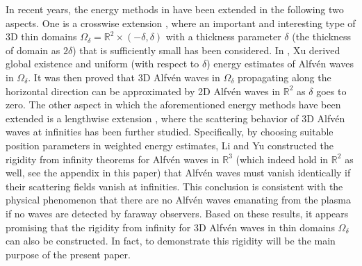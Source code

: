 \documentclass[10pt,reqno]{amsart}
\numberwithin{equation}{section}
\begin{document}
 In recent years, the 
energy methods in \cite{He-Xu-Yu} have been extended in the following 
two aspects. One is a crosswise extension \cite{Xu}, where an important and
 interesting type of  
3D thin domains $\Omega_{\delta}=\mathbb{R}^2\times (-\delta,\delta)$ with a thickness parameter $\delta$ (the thickness of domain as $2\delta$) that is sufficiently small has been  
considered.  
In \cite{Xu}, Xu derived global existence and uniform (with respect to $\delta$) energy estimates  of Alfv\'en waves in $\Omega_\delta$.  
It was then proved that  3D Alfv\'en waves in $\Omega_\delta$ propagating along the horizontal direction can be approximated by 2D Alfv\'en waves in $\mathbb{R}^2$ as
 $\delta$ goes to zero. 
The other aspect in which the aforementioned energy methods have been extended 
is a lengthwise extension \cite{Li-Yu}, where the scattering behavior of 3D 
 Alfv\'en waves at infinities has  been further 
 studied.  
 Specifically, by choosing suitable position parameters in weighted energy estimates, Li and Yu constructed the rigidity from infinity theorems for Alfv\'en waves in $\mathbb{R}^{3}$ (which indeed hold in $\mathbb{R}^{2}$ as well, see the appendix in this paper) that Alfv\'en waves must vanish identically if their scattering fields vanish at infinities. This conclusion is consistent with the physical phenomenon 
that there are no Alfv\'en waves emanating from the plasma if no waves are detected by faraway observers. Based on these results, 
it appears promising that the rigidity from infinity for 3D Alfv\'en waves in thin domains $\Omega_\delta$ can  also be constructed. In fact, to demonstrate this rigidity will be the main purpose of the present  paper. 
\end{document}
